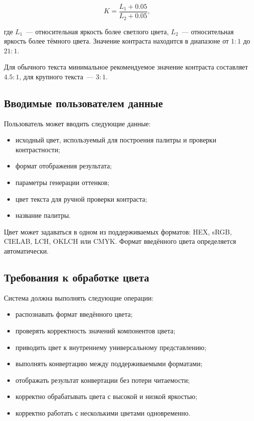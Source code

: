 \[
K = \frac{L_1 + 0.05}{L_2 + 0.05},
\]

где \(L_1\)~--- относительная яркость более светлого цвета, \(L_2\)~--- относительная яркость более тёмного цвета. Значение контраста находится в диапазоне от \(1:1\) до \(21:1\).

Для обычного текста минимальное рекомендуемое значение контраста составляет \(4.5:1\), для крупного текста~--- \(3:1\).

\subsection*{Вводимые пользователем данные}

Пользователь может вводить следующие данные:

\begin{itemize}
    \item исходный цвет, используемый для построения палитры и проверки контрастности;
    \item формат отображения результата;
    \item параметры генерации оттенков;
    \item цвет текста для ручной проверки контраста;
    \item название палитры.
\end{itemize}

Цвет может задаваться в одном из поддерживаемых форматов: HEX, sRGB, CIELAB, LCH, OKLCH или CMYK. Формат введённого цвета определяется автоматически.

\subsection*{Требования к обработке цвета}

Система должна выполнять следующие операции:

\begin{itemize}
    \item распознавать формат введённого цвета;
    \item проверять корректность значений компонентов цвета;
    \item приводить цвет к внутреннему универсальному представлению;
    \item выполнять конвертацию между поддерживаемыми форматами;
    \item отображать результат конвертации без потери читаемости;
    \item корректно обрабатывать цвета с высокой и низкой яркостью;
    \item корректно работать с несколькими цветами одновременно.
\end{itemize}

